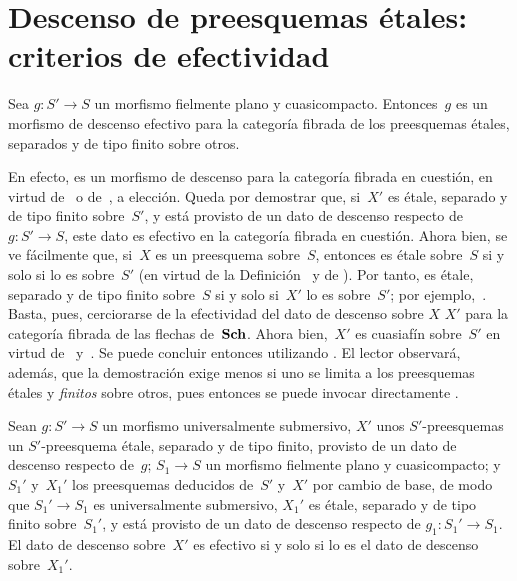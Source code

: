 \section{Descenso de preesquemas étales: criterios de efectividad}
\label{IX.4}

{\enlargethispage{.7cm}}%
\begin{proposition}
\label{IX.4.1}
Sea $g\colon S'\to S$ un morfismo fielmente plano y cuasicompacto.
Entonces~$g$ es un morfismo de descenso efectivo para la categoría
fibrada de los preesquemas étales, separados y de tipo finito sobre otros.
\end{proposition}

En efecto, es un morfismo de descenso para la categoría fibrada en
cuestión, en virtud de~ o de~, a elección.
Queda por demostrar que, si~$X'$ es étale, separado y de tipo finito
sobre~$S'$, y está provisto de un dato de descenso respecto de
$g\colon S'\to S$, este dato es efectivo en la categoría fibrada en
cuestión. Ahora bien, se ve fácilmente que, si~$X$ es un preesquema
sobre~$S$, entonces
es étale sobre~$S$ si y solo si lo es sobre~$S'$ (en virtud de la
Definición~ y de \loccit {}). Por tanto, es
étale, separado y de tipo finito sobre~$S$ si y solo si~$X'$ lo es
sobre~$S'$; \cf por ejemplo,~. Basta, pues, cerciorarse de
la efectividad del dato de descenso sobre
{$X$}
{$X'$}
para la categoría fibrada de las flechas de~$\mathbf{Sch}$. Ahora bien,~$X'$ es
cuasiafín sobre~$S'$ en virtud de~
y~. Se puede concluir entonces utilizando
. El lector observará, además, que la demostración
exige menos si uno se limita a los preesquemas étales y \emph{finitos}
sobre otros, pues entonces se puede invocar directamente
.

\begin{corollaire}
\label{IX.4.2}
Sean $g\colon S'\to S$ un morfismo universalmente submersivo, $X'$
{unos $S'$-preesquemas}
{un $S'$-preesquema}
étale, separado y de tipo finito, provisto de un dato de descenso respecto
de~$g$; $S_1\to S$ un morfismo fielmente plano y cuasicompacto; y~$S_1'$
y~$X_1'$ los preesquemas deducidos de~$S'$ y~$X'$ por cambio de base, de
modo que $S_1'\to S_1$ es universalmente submersivo, $X_1'$ es étale,
separado y de tipo finito sobre~$S_1'$, y está provisto de un dato de
descenso respecto de $g_1\colon S_1'\to S_1$. El dato de descenso
sobre~$X'$ es efectivo si y solo si lo es el dato de descenso sobre~$X_1'$.
\end{corollaire}

